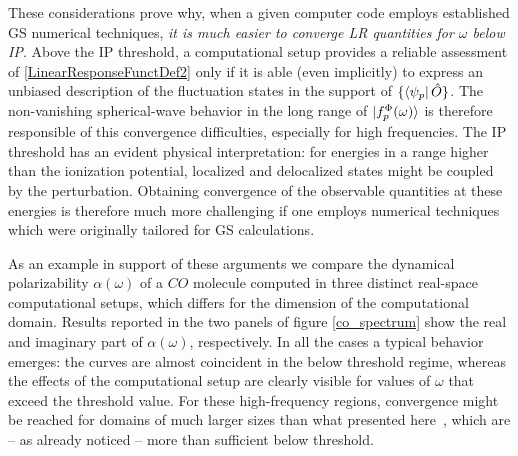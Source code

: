 \documentclass[reprint,aps,prb]{revtex4-1}
\newcommand{\op}[1]{\hat {#1}}
\begin{document}
These considerations prove why, when a given computer code employs established GS numerical techniques,
\emph{it is much easier to converge LR quantities for $\omega$ below IP}.
Above the IP threshold, a computational setup
provides a reliable assessment of \eqref{LinearResponseFunctDef2} only if it is able (even implicitly) to express an
unbiased description of the fluctuation states in the support of $\{\bra{\psi_p}\op O\}$.
The non-vanishing spherical-wave behavior in the long range of $\ket{f_p^\Phi(\omega)}$ is therefore responsible
of this convergence difficulties, especially for high frequencies.
The IP threshold has an evident physical interpretation: for energies in a range higher than the ionization potential,
localized and delocalized states might be coupled by the perturbation. Obtaining convergence of the observable quantities at these energies is therefore much more challenging if one employs
numerical techniques which were originally tailored for GS calculations.

As an example in support of these arguments we compare the {dynamical polarizability $\alpha(\omega)$} of a $CO$ molecule computed in three distinct real-space computational setups, which differs for the dimension of the computational domain.
Results reported in the two panels of figure \ref{co_spectrum} show the real and imaginary part of $\alpha(\omega)$, respectively. In all the cases a typical behavior emerges: the curves are almost coincident in the below threshold regime,
whereas the effects of the computational setup are clearly visible for values of  $\omega$ that exceed the threshold value.
For these high-frequency regions, convergence might be reached for domains of much larger sizes than what presented here~\cite{baroni2008},
which are -- as already noticed -- more than sufficient below threshold.
\end{document}
